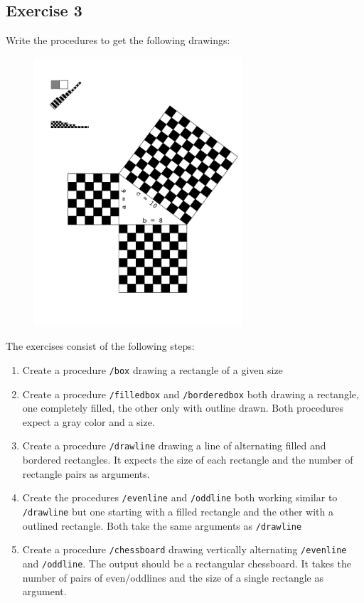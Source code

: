 \documentclass [11pt, twoside]{article}
\begin{document}
\subsection*{Exercise 3}
Write the procedures to get the following drawings:\\
\begin{figure}[H]
    \centerline{\includegraphics[height=10cm]{exercise3}}
\end{figure}	



The exercises consist of the following steps:
\begin{enumerate}
	\item Create a procedure \texttt{/box} drawing a rectangle of a given size
	\item Create a procedure \texttt{/filledbox} and \texttt{/borderedbox}
		both drawing a rectangle, one completely filled, the other only with
		outline drawn. Both procedures expect a gray color and a size.
	\item Create a procedure \texttt{/drawline} drawing a line of alternating
		filled and bordered rectangles. It expects the size of each rectangle
		and the number of rectangle pairs as arguments.
	\item Create the procedures \texttt{/evenline} and \texttt{/oddline} both
		working similar to \texttt{/drawline} but one starting with a filled
		rectangle and the other with a outlined rectangle. Both take the same
		arguments as \texttt{/drawline}
	\item Create a procedure \texttt{/chessboard} drawing vertically alternating
		\texttt{/evenline} and \texttt{/oddline}. The output should be a
		rectangular chessboard. It takes the number of pairs of even/oddlines
		and the size of a single rectangle as argument. 
\end{enumerate}


\solution{}

\end{document}
